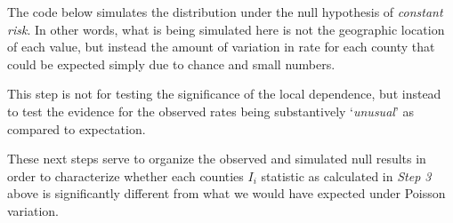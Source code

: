 \documentclass[
]{book}
\newenvironment{Shaded}{\begin{snugshade}}{\end{snugshade}}
\newcommand{\AttributeTok}[1]{\textcolor[rgb]{0.77,0.63,0.00}{#1}}
\newcommand{\CommentTok}[1]{\textcolor[rgb]{0.56,0.35,0.01}{\textit{#1}}}
\newcommand{\ControlFlowTok}[1]{\textcolor[rgb]{0.13,0.29,0.53}{\textbf{#1}}}
\newcommand{\DecValTok}[1]{\textcolor[rgb]{0.00,0.00,0.81}{#1}}
\newcommand{\FunctionTok}[1]{\textcolor[rgb]{0.00,0.00,0.00}{#1}}
\newcommand{\NormalTok}[1]{#1}
\newcommand{\OtherTok}[1]{\textcolor[rgb]{0.56,0.35,0.01}{#1}}
\newcommand{\SpecialCharTok}[1]{\textcolor[rgb]{0.00,0.00,0.00}{#1}}
\begin{document}
The code below simulates the distribution under the null hypothesis of \emph{constant risk}. In other words, what is being simulated here is not the geographic location of each value, but instead the amount of variation in rate for each county that could be expected simply due to chance and small numbers.

This step is not for testing the significance of the local dependence, but instead to test the evidence for the observed rates being substantively `\emph{unusual}' as compared to expectation.

\begin{Shaded}
\end{Shaded}

These next steps serve to organize the observed and simulated null results in order to characterize whether each counties \(I_i\) statistic as calculated in \emph{Step 3} above is significantly different from what we would have expected under Poisson variation.
\end{document}
